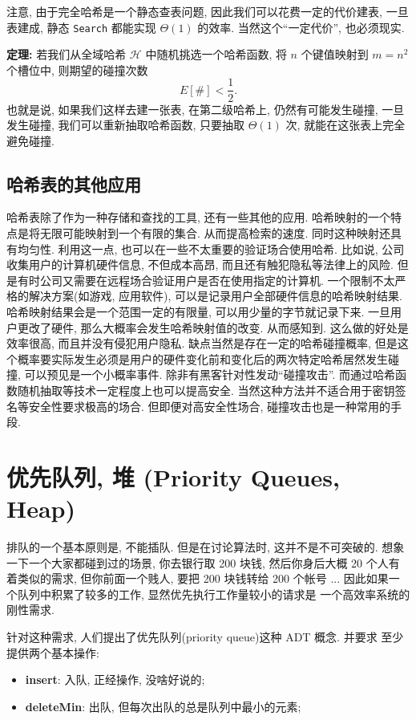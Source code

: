 \documentclass[a4paper]{ctexart}
\theoremstyle{definition}
\theoremstyle{definition}
\begin{document}
注意, 由于完全哈希是一个静态查表问题, 因此我们可以花费一定的代价建表, 
一旦表建成, 静态 \verb|Search| 都能实现 $\Theta(1)$ 的效率. 
当然这个``一定代价'', 也必须现实.

{\bf 定理:} 若我们从全域哈希 $\mathscr{H}$ 中随机挑选一个哈希函数, 将 $n$ 
个键值映射到 $m = n^2$ 个槽位中, 则期望的碰撞次数
$$
E[\#] < \frac{1}{2}.
$$
也就是说, 如果我们这样去建一张表, 在第二级哈希上, 仍然有可能发生碰撞, 
一旦发生碰撞, 我们可以重新抽取哈希函数, 只要抽取 $\Theta(1)$ 次, 就能在这张表上完全避免碰撞.

\subsection{哈希表的其他应用}

哈希表除了作为一种存储和查找的工具, 还有一些其他的应用. 哈希映射的一个特点是将无限可能映射到一个有限的集合. 
从而提高检索的速度. 同时这种映射还具有均匀性. 利用这一点, 也可以在一些不太重要的验证场合使用哈希. 
比如说, 公司收集用户的计算机硬件信息, 不但成本高昂, 而且还有触犯隐私等法律上的风险. 
但是有时公司又需要在远程场合验证用户是否在使用指定的计算机. 一个限制不太严格的解决方案(如游戏, 应用软件), 
可以是记录用户全部硬件信息的哈希映射结果. 哈希映射结果会是一个范围一定的有限量, 可以用少量的字节就记录下来. 
一旦用户更改了硬件, 那么大概率会发生哈希映射值的改变. 从而感知到. 这么做的好处是效率很高, 而且并没有侵犯用户隐私. 
缺点当然是存在一定的哈希碰撞概率, 但是这个概率要实际发生必须是用户的硬件变化前和变化后的两次特定哈希居然发生碰撞, 
可以预见是一个小概率事件. 除非有黑客针对性发动``碰撞攻击''. 
而通过哈希函数随机抽取等技术一定程度上也可以提高安全. 当然这种方法并不适合用于密钥签名等安全性要求极高的场合. 
但即便对高安全性场合, 碰撞攻击也是一种常用的手段. 

\section{优先队列, 堆 (Priority Queues, Heap)}
排队的一个基本原则是, 不能插队. 但是在讨论算法时, 这并不是不可突破的.
想象一下一个大家都碰到过的场景, 你去银行取 200 块钱, 然后你身后大概 20
个人有着类似的需求, 但你前面一个贱人, 要把 200 块钱转给 200 个帐号
... 因此如果一个队列中积累了较多的工作, 显然优先执行工作量较小的请求是
一个高效率系统的刚性需求.

针对这种需求, 人们提出了优先队列(priority queue)这种 ADT 概念. 并要求
至少提供两个基本操作:

\begin{itemize}
\item {\bf insert}: 入队, 正经操作, 没啥好说的;
\item {\bf deleteMin}: 出队, 但每次出队的总是队列中最小的元素; 
\end{itemize}
\end{document}
